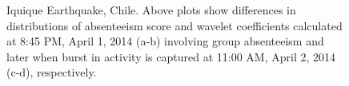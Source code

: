 \begin{figure}[t]
	\centering
	\hfill
	\hfill
	\hfill
\vspace{-2mm}
	\caption{Iquique Earthquake, Chile. Above plots show differences in distributions of absenteeism score and wavelet coefficients calculated at 8:45 PM, April 1, 2014 (a-b) involving group absenteeism and later when burst in activity is captured at 11:00 AM, April 2, 2014 (c-d), respectively.}
\label{fig:case1_wavelet}
\end{figure}

